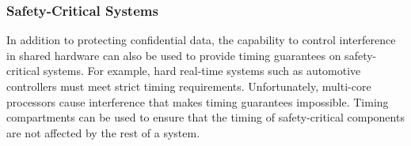 \subsubsection{Safety-Critical Systems}

In addition to protecting confidential data, the capability to control 
interference in shared hardware can also be used to provide timing guarantees on 
safety-critical systems. For example, hard real-time systems such as automotive 
controllers must meet strict timing requirements. Unfortunately, multi-core
processors cause interference that makes timing guarantees impossible. Timing
compartments can be used to ensure that the timing of safety-critical components 
are not affected by the rest of a system.

